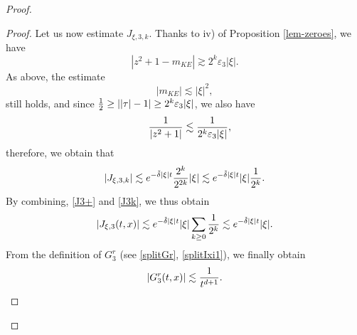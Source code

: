 \documentclass[11pt]{amsart}
\numberwithin{equation}{section}
\newcommand{\eps}{\varepsilon}
\begin{document}
\begin{proof}
\begin{proof}
   Let us now estimate $J_{\xi, 3, k}$.  Thanks to iv) of Proposition \ref{lem-zeroes}, we have
     \begin{equation}
     \label{below4} |z^2 + 1- m_{KE}| \gtrsim  2^k \eps_{3}  | \xi|.
     \end{equation}
    As above,  the estimate 
        $$ |m_{KE}| \lesssim | \xi|^2,$$
     still holds, and since $  { 1 \over 2} \geq | |\tau| - 1 | \geq 2^k \eps_{3}|\xi|$, we also have
     $$
         \quad { 1 \over |z^2 + 1|}
     \lesssim { 1 \over  2^k \eps_{3} | \xi|}, $$
   therefore,    we obtain  that
  \begin{equation}
  \label{J3k}  |J_{\xi, 3, k}| \lesssim e^{ - \tilde \delta | \xi| t} { 2^k \over  2^{2k }} |\xi | \lesssim e^{ - \tilde \delta | \xi| t} | \xi|
   { 1 \over 2^k}.
   \end{equation}
     By combining, \eqref{J3+} and \eqref{J3k}, we thus  obtain
   $$ |J_{\xi, 3}(t,x) | \lesssim  e^{ - \tilde \delta | \xi| t} | \xi| \sum_{k \geq 0} {1 \over 2^k} \lesssim e^{ - \tilde \delta | \xi| t} | \xi|.$$
   From the definition of $G^r_{3}$ (see \eqref{splitGr}, \eqref{splitIxi1}), we finally obtain
   $$ | G^r_{3}(t,x) | \lesssim { 1 \over t^{d+1}}.$$ 
   

\end{proof}
\end{proof}
\end{document}
